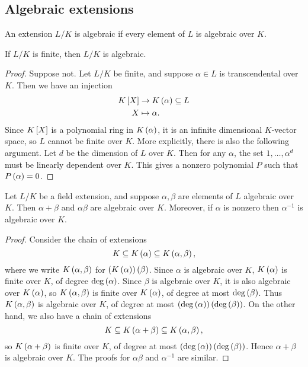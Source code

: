 \subsection{Algebraic extensions}

\begin{definition}
An extension $ L / K $ is algebraic if every element of $ L $ is algebraic over $ K $.
\end{definition}

\begin{proposition}
If $ L / K $ is finite, then $ L / K $ is algebraic.
\end{proposition}

\begin{proof}
Suppose not. Let $ L / K $ be finite, and suppose $ \alpha \in L $ is transcendental over $ K $. Then we have an injection
\begin{align*}
K\sb{X} & \to K\rb{\alpha} \subseteq L \\
X & \mapsto \alpha.
\end{align*}
Since $ K\sb{X} $ is a polynomial ring in $ K\rb{\alpha} $, it is an infinite dimensional $ K $-vector space, so $ L $ cannot be finite over $ K $. More explicitly, there is also the following argument. Let $ d $ be the dimension of $ L $ over $ K $. Then for any $ \alpha $, the set $ 1, \dots, \alpha^d $ must be linearly dependent over $ K $. This gives a nonzero polynomial $ P $ such that $ P\rb{\alpha} = 0 $.
\end{proof}

\begin{corollary}
Let $ L / K $ be a field extension, and suppose $ \alpha, \beta $ are elements of $ L $ algebraic over $ K $. Then $ \alpha + \beta $ and $ \alpha\beta $ are algebraic over $ K $. Moreover, if $ \alpha $ is nonzero then $ \alpha^{-1} $ is algebraic over $ K $.
\end{corollary}

\begin{proof}
Consider the chain of extensions
$$ K \subseteq K\rb{\alpha} \subseteq K\rb{\alpha, \beta}, $$
where we write $ K\rb{\alpha, \beta} $ for $ \rb{K\rb{\alpha}}\rb{\beta} $. Since $ \alpha $ is algebraic over $ K $, $ K\rb{\alpha} $ is finite over $ K $, of degree $ \deg\rb{\alpha} $. Since $ \beta $ is algebraic over $ K $, it is also algebraic over $ K\rb{\alpha} $, so $ K\rb{\alpha, \beta} $ is finite over $ K\rb{\alpha} $, of degree at most $ \deg\rb{\beta} $. Thus $ K\rb{\alpha, \beta} $ is algebraic over $ K $, of degree at most $ \rb{\deg\rb{\alpha}}\rb{\deg\rb{\beta}} $. On the other hand, we also have a chain of extensions
$$ K \subseteq K\rb{\alpha + \beta} \subseteq K\rb{\alpha, \beta}, $$
so $ K\rb{\alpha + \beta} $ is finite over $ K $, of degree at most $ \rb{\deg\rb{\alpha}}\rb{\deg\rb{\beta}} $. Hence $ \alpha + \beta $ is algebraic over $ K $. The proofs for $ \alpha\beta $ and $ \alpha^{-1} $ are similar.
\end{proof}

